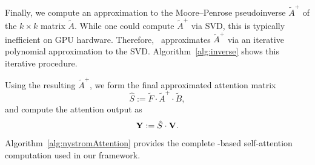 \documentclass[letterpaper,twocolumn,10pt]{article}
\begin{document}
Finally, we compute an approximation to the Moore--Penrose pseudoinverse $\tilde{A}^{+}$ of the $k\times k$ matrix $\tilde{A}$. While one could compute $\tilde{A}^{+}$ via SVD, this is typically inefficient on GPU hardware. Therefore, \nystromformer\ approximates $\tilde{A}^{+}$ via an iterative polynomial approximation to the SVD. Algorithm~\ref{alg:inverse} shows this iterative procedure. 

Using the resulting $\tilde{A}^{+}$, we form the final approximated attention matrix
\[
    \hat{S} := \tilde{F}\cdot \tilde{A}^{+}\cdot \tilde{B},
\]
and compute the attention output as
\[
    {\mathbf{Y}} := \hat{S} \cdot {\mathbf{V}}.
\]
Algorithm~\ref{alg:nystromAttention} provides the complete \nystrom-based self-attention computation used in our framework.

\begin{algorithm}[t!]
\raggedright
{}
\caption{Select landmarks}
\label{alg:landmark}
\end{algorithm}
\end{document}

